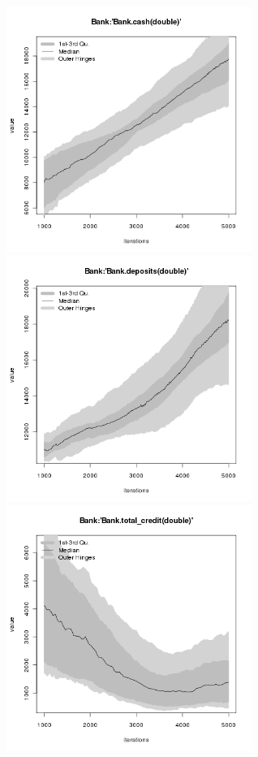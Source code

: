 \begin{figure}[H!]
\centering\leavevmode
\begin{minipage}{17cm}
\centering\leavevmode
\includegraphics[width=8cm]{./png/tax_0.10/Bank-cash.png}
\includegraphics[width=8cm]{./png/tax_0.10/Bank-deposits.png}\\
\includegraphics[width=8cm]{./png/tax_0.10/Bank-total_credit.png}

\end{minipage}
\end{figure}
